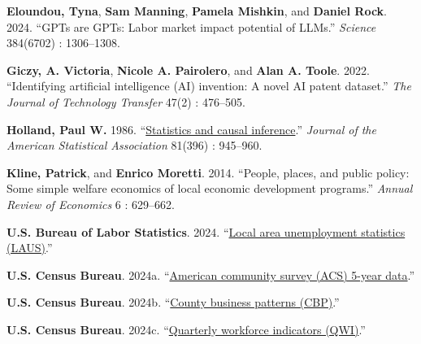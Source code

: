 \documentclass[
]{article}
\newlength{\cslhangindent}
\newenvironment{CSLReferences}[2] %
 {\begin{list}{}{%
  \setlength{\itemindent}{0pt}
  \setlength{\leftmargin}{0pt}
  \setlength{\parsep}{0pt}
  \ifodd #1
   \setlength{\leftmargin}{\cslhangindent}
   \setlength{\itemindent}{-1\cslhangindent}
  \fi
  \setlength{\itemsep}{#2\baselineskip}}}
 {\end{list}}
\begin{document}
\begin{CSLReferences}{1}{0}
\textbf{Eloundou, Tyna}, \textbf{Sam Manning}, \textbf{Pamela Mishkin},
and \textbf{Daniel Rock}. 2024. {``GPTs are GPTs: Labor market impact
potential of LLMs.''} \emph{Science} 384(6702) : 1306--1308.

\textbf{Giczy, A. Victoria}, \textbf{Nicole A. Pairolero}, and
\textbf{Alan A. Toole}. 2022. {``Identifying artificial intelligence
(AI) invention: A novel AI patent dataset.''} \emph{The Journal of
Technology Transfer} 47(2) : 476--505.

\textbf{Holland, Paul W.} 1986.
{``\href{https://doi.org/10.1080/01621459.1986.10478354}{Statistics and
causal inference}.''} \emph{Journal of the American Statistical
Association} 81(396) : 945--960.

\textbf{Kline, Patrick}, and \textbf{Enrico Moretti}. 2014. {``People,
places, and public policy: Some simple welfare economics of local
economic development programs.''} \emph{Annual Review of Economics} 6 :
629--662.

\textbf{U.S. Bureau of Labor Statistics}. 2024.
{``\href{https://www.bls.gov/lau/}{Local area unemployment statistics
(LAUS)}.''}

\textbf{U.S. Census Bureau}. 2024a.
{``\href{https://www.census.gov/data/datasets/time-series/econ/acs/acs-datasets.html}{American
community survey (ACS) 5-year data}.''}

\textbf{U.S. Census Bureau}. 2024b.
{``\href{https://www.census.gov/programs-surveys/cbp/data/datasets.html}{County
business patterns (CBP)}.''}

\textbf{U.S. Census Bureau}. 2024c.
{``\href{https://lehd.ces.census.gov/data/}{Quarterly workforce
indicators (QWI)}.''}

\end{CSLReferences}
\end{document}
